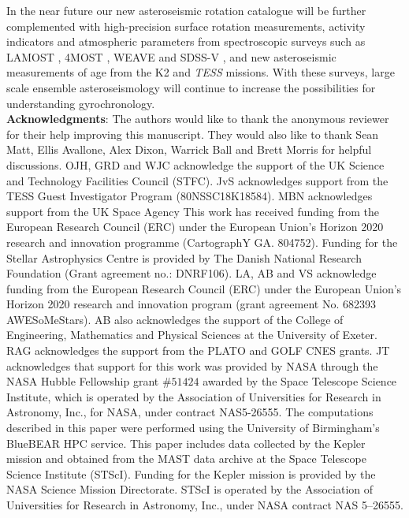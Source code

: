 \documentclass[12pt]{article}
\newcommand{\tess}{\emph{TESS}\xspace}
\newcommand{\ktwo}{K2\xspace}
\begin{document}
In the near future our new asteroseismic rotation catalogue will be further complemented with high-precision surface rotation measurements, activity indicators and atmospheric parameters from spectroscopic surveys such as LAMOST \cite{deng+2012}, 4MOST \cite{dejong+2014}, WEAVE \cite{dalton+2014} and SDSS-V \cite{blanton+2019, kollmeier+2019}, and new asteroseismic measurements of age from the \ktwo and \tess missions. With these surveys, large scale ensemble asteroseismology will continue to increase the possibilities for understanding gyrochronology.\\


%

\newpage
\textbf{Acknowledgments}: The authors would like to thank the anonymous reviewer for their help improving this manuscript. They would also like to thank Sean Matt, Ellis Avallone, Alex Dixon, Warrick Ball and Brett Morris for helpful discussions.
OJH, GRD and WJC acknowledge the support of the UK Science and Technology Facilities Council (STFC). 
JvS acknowledges support from the TESS Guest Investigator Program (80NSSC18K18584).
MBN acknowledges support from the UK Space Agency
This work has received funding from the European Research Council (ERC) under the European Union's Horizon 2020 research and innovation programme (CartographY GA. 804752).
Funding for the Stellar Astrophysics Centre is provided by The Danish National Research Foundation (Grant agreement no.: DNRF106). 
LA, AB and VS acknowledge funding from the European Research Council (ERC) under the European Union's Horizon 2020 research and innovation program (grant agreement No. 682393 AWESoMeStars). AB also acknowledges the support of the College of Engineering, Mathematics and Physical Sciences at the University of Exeter.
RAG acknowledges the support from the PLATO and GOLF CNES grants.
JT acknowledges that support for this work was provided by NASA through the NASA Hubble Fellowship grant $\#51424$ awarded by the Space Telescope Science Institute, which is operated by the Association of Universities for Research in Astronomy, Inc., for NASA, under contract NAS5-26555.
The computations described in this paper were performed using the University of Birmingham's BlueBEAR HPC service.
This paper includes data collected by the Kepler mission and obtained from the MAST data archive at the Space Telescope Science Institute (STScI). Funding for the Kepler mission is provided by the NASA Science Mission Directorate. STScI is operated by the Association of Universities for Research in Astronomy, Inc., under NASA contract NAS 5–26555.\\
\end{document}
